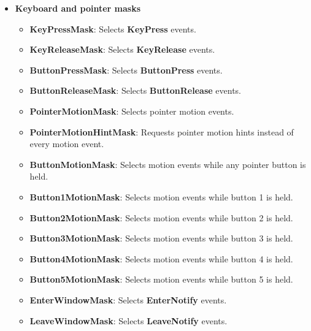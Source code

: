 \documentclass{report}
\begin{document}
\begin{itemize}
\begin{itemize}
                \item \textbf{MotionNotify}: Generated when the pointer moves.
                \item \textbf{EnterNotify}: Generated when the pointer enters a window.
                \item \textbf{LeaveNotify}: Generated when the pointer leaves a window.
                \item \textbf{KeymapNotify}: Reports the current keyboard state, usually after focus or crossing changes.
            \end{itemize}
        \item \textbf{Keyboard and pointer masks}
            \bigbreak \noindent
            \begin{itemize}
                \item \textbf{KeyPressMask}: Selects \textbf{KeyPress} events.
                \item \textbf{KeyReleaseMask}: Selects \textbf{KeyRelease} events.
                \item \textbf{ButtonPressMask}: Selects \textbf{ButtonPress} events.
                \item \textbf{ButtonReleaseMask}: Selects \textbf{ButtonRelease} events.
                \item \textbf{PointerMotionMask}: Selects pointer motion events.
                \item \textbf{PointerMotionHintMask}: Requests pointer motion hints instead of every motion event.
                \item \textbf{ButtonMotionMask}: Selects motion events while any pointer button is held.
                \item \textbf{Button1MotionMask}: Selects motion events while button 1 is held.
                \item \textbf{Button2MotionMask}: Selects motion events while button 2 is held.
                \item \textbf{Button3MotionMask}: Selects motion events while button 3 is held.
                \item \textbf{Button4MotionMask}: Selects motion events while button 4 is held.
                \item \textbf{Button5MotionMask}: Selects motion events while button 5 is held.
                \item \textbf{EnterWindowMask}: Selects \textbf{EnterNotify} events.
                \item \textbf{LeaveWindowMask}: Selects \textbf{LeaveNotify} events.

\end{itemize}
\end{itemize}
\end{document}
